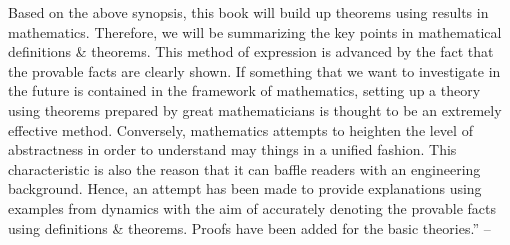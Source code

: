 \documentclass[oneside]{book}
\numberwithin{equation}{section}
\begin{document}
Based on the above synopsis, this book will build up theorems using results in mathematics. Therefore, we will be summarizing the key points in mathematical definitions \& theorems. This method of expression is advanced by the fact that the provable facts are clearly shown. If something that we want to investigate in the future is contained in the framework of mathematics, setting up a theory using theorems prepared by great mathematicians is thought to be an extremely effective method. Conversely, mathematics attempts to heighten the level of abstractness in order to understand may things in a unified fashion. This characteristic is also the reason that it can baffle readers with an engineering background. Hence, an attempt has been made to provide explanations using examples from dynamics with the aim of accurately denoting the provable facts using definitions \& theorems. Proofs have been added for the basic theories.'' -- \cite[pp. v--viii]{Azegami2020}


\printbibliography[heading=bibintoc]
	
\end{document}
